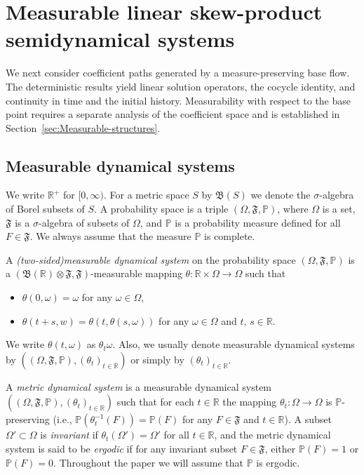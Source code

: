 \documentclass[reqno]{amsart}
\theoremstyle{plain}
\numberwithin{equation}{section}
\numberwithin{definition}{section}
\newcommand\RR{\ensuremath{\mathbb{R}}}
\newcommand\PP{\ensuremath{\mathbb{P}}}
\newcommand{\OFP}{\ensuremath{(\Omega,\mathfrak{F},\PP)}}
\begin{document}
{
\section{Measurable linear skew-product semidynamical systems}\label{sec:skew-product}
We next consider coefficient paths generated by a
measure-preserving base flow.
The deterministic results yield linear solution operators,
the cocycle identity, and continuity in time and
the initial history.
Measurability with respect to the base point requires
a separate analysis of the coefficient space and
is established in Section~\ref{sec:Measurable-structures}.

\subsection{Measurable dynamical systems}\label{subsec:MDS}
We write $\RR^{+}$ for $[0, \infty)$. For a metric space $S$ by $\mathfrak{B}(S)$ we denote the $\sigma$\nobreakdash-\hspace{0pt}algebra of Borel subsets of $S$. A probability space is a triple $\OFP$, where $\Omega$ is a set, $\mathfrak{F}$ is a $\sigma$\nobreakdash-\hspace{0pt}algebra of subsets of $\Omega$, and $\PP$ is a probability measure defined for all $F \in \mathfrak{F}$.  We always assume that the measure $\PP$ is complete.
\par\smallskip
A {\em \textup{(}two\nobreakdash-\hspace{0pt}sided\textup{)}measurable dynamical system} on the probability space $\OFP$ is a $(\mathfrak{B}(\RR) \otimes \mathfrak{F},\mathfrak{F})$\nobreakdash-\hspace{0pt}measurable mapping $\theta\colon\RR\times \Omega\to \Omega$ such that
\begin{itemize}[label=\raisebox{0.25ex}{\tiny$\bullet$}]
\item $\theta(0,\omega)=\omega$ for any $\omega  \in \Omega$,
\item $\theta(t+s,w)=\theta(t,\theta(s,\omega))$ for any $\omega  \in \Omega$ and $t,\,s \in \RR$.  
\end{itemize}
We write $\theta(t,\omega)$ as $\theta_t\omega$. Also, we usually denote measurable dynamical systems by $(\OFP,(\theta_{t})_{t \in \RR})$ or simply by $(\theta_{t})_{t \in \RR}$. 
\par
A {\em metric dynamical system} is a measurable dynamical system $(\OFP,(\theta_{t})_{t \in \RR})$
such that for each $t\in\RR$  the mapping $\theta_t\colon \Omega\to\Omega$ is $\PP$-preserving (i.e., $\PP(\theta_t^{-1}(F))=\PP(F)$ for any $F\in\mathfrak{F}$ and $t\in\RR$).
A subset $\Omega'\subset\Omega$ is \emph{invariant} if $\theta_t(\Omega')=\Omega'$ for all $t\in\RR$, and the metric dynamical system is said to be \emph{ergodic} if for any invariant subset  $F \in \mathfrak{F}$, either $\PP(F) = 1$ or $\PP(F) = 0$. Throughout the paper we will assume that $\PP$ is ergodic. 


}
\end{document}
